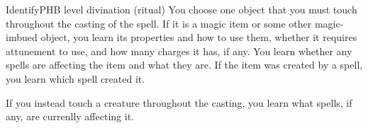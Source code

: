 \begin{spell}{Identify}{PHB}{ level divination (ritual)}
{
}
You choose one object that you must touch throughout
the casting of the spell. If it is a magic item or some
other magic-imbued object, you learn its properties
and how to use them, whether it requires attunement
to use, and how many charges it has, if any. You learn
whether any spells are affecting the item and what they
are. If the item was created by a spell, you learn which
spell created it.

If you instead touch a creature throughout the casting,
you learn what spells, if any, are currenlly affecting it.
\end{spell}